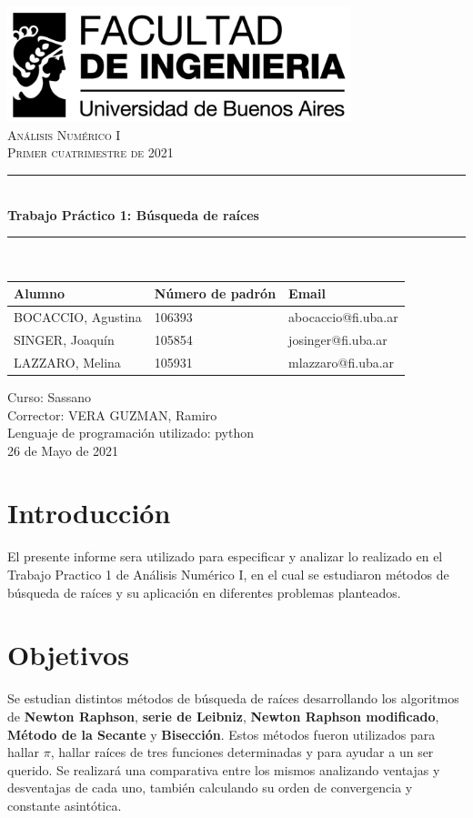 \documentclass[titlepage,a4paper]{article}
\newcommand{\HRule}{\rule{\linewidth}{0.5mm}}
\begin{document}
\begin{titlepage} %
	\includegraphics[width=0.75\textwidth]{logofiuba.jpg}\\[4cm] 
    \centering
    \textsc{\LARGE Análisis Numérico I}\\[0.5cm]
    \textsc{\Large Primer cuatrimestre de 2021 }\\[0.5cm]  
    \HRule \\[0.4cm]
    {\huge \bfseries Trabajo Práctico 1: Búsqueda de raíces}\\[0.3cm]
    \HRule \\[2cm]
  	\Large
  	\begin{tabular}{ | l | l | l | }
  	    \hline
  	     Alumno & Número de padrón & Email \\ \hline
  	     BOCACCIO, Agustina & 106393 & abocaccio@fi.uba.ar \\
  	     SINGER, Joaquín & 105854 & josinger@fi.uba.ar \\
  	     LAZZARO, Melina & 105931 & mlazzaro@fi.uba.ar\\
  	     \hline
  	\end{tabular}
  	\vfill
            {\Large Curso: Sassano}\\
            {\Large Corrector: VERA GUZMAN, Ramiro}\\
            {\Large Lenguaje de programación utilizado: python}\\
  	\vfill
  	{\large 26 de Mayo de 2021}
\end{titlepage}

\tableofcontents %
\newpage
\section{Introducción}
El presente informe sera utilizado para especificar y analizar lo realizado en el Trabajo Practico 1 de Análisis Numérico I, en el cual se estudiaron métodos de búsqueda de raíces y su aplicación en diferentes problemas planteados.

\section{Objetivos}
Se estudian distintos métodos de búsqueda de raíces desarrollando los algoritmos de \textbf{Newton Raphson}, \textbf{serie de Leibniz}, \textbf{Newton Raphson modificado}, \textbf{Método de la Secante} y \textbf{Bisección}. Estos métodos fueron utilizados para hallar $\pi$, hallar raíces de tres funciones determinadas y para ayudar a un ser querido. Se realizará una comparativa entre los mismos analizando ventajas y desventajas de cada uno, también calculando su orden de convergencia y constante asintótica.
\end{document}
